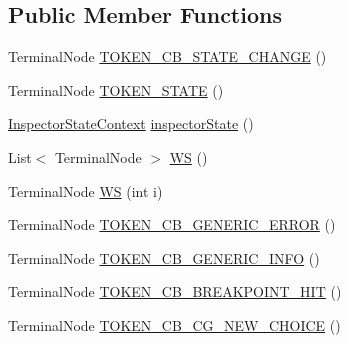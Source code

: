 \subsection*{Public Member Functions}
\begin{DoxyCompactItemize}
\item 
Terminal\+Node \hyperlink{classgov_1_1nasa_1_1jpf_1_1inspector_1_1client_1_1parser_1_1_console_grammar_parser_1_1_cmd_callback_context_a4771237a031975b0df4ced82a52025c7}{T\+O\+K\+E\+N\+\_\+\+C\+B\+\_\+\+S\+T\+A\+T\+E\+\_\+\+C\+H\+A\+N\+GE} ()
\item 
Terminal\+Node \hyperlink{classgov_1_1nasa_1_1jpf_1_1inspector_1_1client_1_1parser_1_1_console_grammar_parser_1_1_cmd_callback_context_ac80c104b7a44d1717b1b100583f9ca65}{T\+O\+K\+E\+N\+\_\+\+S\+T\+A\+TE} ()
\item 
\hyperlink{classgov_1_1nasa_1_1jpf_1_1inspector_1_1client_1_1parser_1_1_console_grammar_parser_1_1_inspector_state_context}{Inspector\+State\+Context} \hyperlink{classgov_1_1nasa_1_1jpf_1_1inspector_1_1client_1_1parser_1_1_console_grammar_parser_1_1_cmd_callback_context_a220349bd62669e7dae80961655a1e3c6}{inspector\+State} ()
\item 
List$<$ Terminal\+Node $>$ \hyperlink{classgov_1_1nasa_1_1jpf_1_1inspector_1_1client_1_1parser_1_1_console_grammar_parser_1_1_cmd_callback_context_a0e2d3daa6ba1089425676793b7dd8ed8}{WS} ()
\item 
Terminal\+Node \hyperlink{classgov_1_1nasa_1_1jpf_1_1inspector_1_1client_1_1parser_1_1_console_grammar_parser_1_1_cmd_callback_context_aefa9b7633b6a15496b2cd6a5bb49c7ed}{WS} (int i)
\item 
Terminal\+Node \hyperlink{classgov_1_1nasa_1_1jpf_1_1inspector_1_1client_1_1parser_1_1_console_grammar_parser_1_1_cmd_callback_context_a36211f08d968337ca34a3369131d6819}{T\+O\+K\+E\+N\+\_\+\+C\+B\+\_\+\+G\+E\+N\+E\+R\+I\+C\+\_\+\+E\+R\+R\+OR} ()
\item 
Terminal\+Node \hyperlink{classgov_1_1nasa_1_1jpf_1_1inspector_1_1client_1_1parser_1_1_console_grammar_parser_1_1_cmd_callback_context_a77ab7bba7aab7ab90271bcee5b6dfd22}{T\+O\+K\+E\+N\+\_\+\+C\+B\+\_\+\+G\+E\+N\+E\+R\+I\+C\+\_\+\+I\+N\+FO} ()
\item 
Terminal\+Node \hyperlink{classgov_1_1nasa_1_1jpf_1_1inspector_1_1client_1_1parser_1_1_console_grammar_parser_1_1_cmd_callback_context_a55483301d0e17a1fab02ca3ec80814a7}{T\+O\+K\+E\+N\+\_\+\+C\+B\+\_\+\+B\+R\+E\+A\+K\+P\+O\+I\+N\+T\+\_\+\+H\+IT} ()
\item 
Terminal\+Node \hyperlink{classgov_1_1nasa_1_1jpf_1_1inspector_1_1client_1_1parser_1_1_console_grammar_parser_1_1_cmd_callback_context_a362d3bfd918013b45d3e0fe6f930e248}{T\+O\+K\+E\+N\+\_\+\+C\+B\+\_\+\+C\+G\+\_\+\+N\+E\+W\+\_\+\+C\+H\+O\+I\+CE} ()

\end{DoxyCompactItemize}
